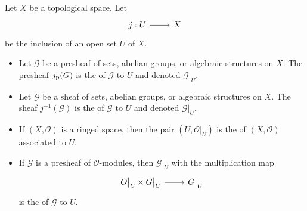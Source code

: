 \documentclass [11 pt, oneside] {article}
\begin{document}
\begin{definition}\label{}\text{}
Let $X$ be a topological space. Let
\[
\begin{tikzcd}
	j:U\ar[r]& X
\end{tikzcd}
\]
be the inclusion of an open set $U$ of $X$.
\begin{itemize}
	\item Let $\mathscr{G}$ be a presheaf of sets, abelian groups, or algebraic structures on $X$. The presheaf $j_{\textup {p}}(\relax{G})$ is the  of $\mathscr{G}$ to $U$ and denoted $\mathscr{G}\big|_{U}$.
	\item Let $\mathscr{G}$ be a sheaf of sets, abelian groups, or algebraic structures on $X$. The sheaf $j^{-1}(\mathscr{G})$ is the  of $\mathscr{G}$ to $U$ and denoted $\mathscr{G}\big|_{U}$.
	\item If $(X,\mathscr{O})$ is a ringed space, then the pair $(U, \mathscr{O}\big|_{U})$ is the  of $(X,\mathscr{O})$ associated to $U$.
	\item If $\mathscr{G}$ is a presheaf of $\mathscr{O}$-modules, then $\mathscr{G}\big|_{U}$ with the multiplication map
		\[
		\begin{tikzcd}
			\mathscr{O}\big|_{U}\times \mathscr{G}\big|_{U}\ar[r]&\mathscr{G}\big|_{U}
		\end{tikzcd}
		\]
		is the  of $\mathscr{G}$ to $U$.
\end{itemize}
\end{definition}

\end{document}
